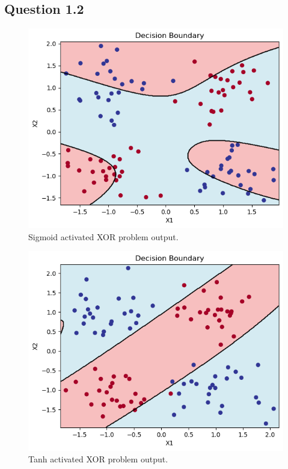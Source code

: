 \documentclass{assignment}
\begin{document}
\subsection{Question 1.2}


\begin{figure}
    \centering
    \includegraphics[width=1\textwidth]{figures/q1_sigmoid.png}
    \caption{Sigmoid activated XOR problem output.}
    \label{fig:sigmoid_q1}
\end{figure}



\begin{figure}
    \centering
    \includegraphics[width=1\textwidth]{figures/q1_tanh.png}
    \caption{Tanh activated XOR problem output.}
    \label{fig:tanh_q1}
\end{figure}
\end{document}
